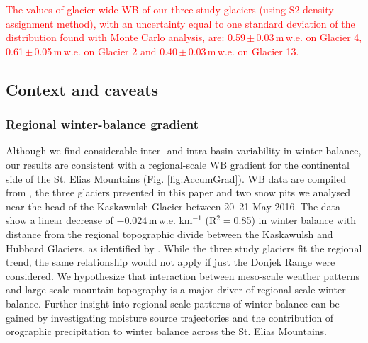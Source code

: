 \documentclass[review,oneside, letterpaper]{igs}
\begin{document}
\textcolor{red}{The values of glacier-wide WB of our three study glaciers (using S2 density assignment method), with an uncertainty equal to one standard deviation of the distribution found with Monte Carlo analysis, are: 0.59\,$\pm$\,0.03\,m\,w.e. on Glacier 4, 0.61\,$\pm$\,0.05\,m\,w.e. on Glacier 2 and 0.40\,$\pm$\,0.03\,m\,w.e. on Glacier 13.}

\subsection{Context and caveats}
\subsubsection{Regional winter-balance gradient}

Although we find considerable inter- and intra-basin variability in winter balance, our results are consistent with a regional-scale WB gradient for the continental side of the St. Elias Mountains (Fig. \ref{fig:AccumGrad}). WB data are compiled from \cite{Taylor1969}, the three glaciers presented in this paper and two snow pits we analysed near the head of the Kaskawulsh Glacier between 20--21 May 2016. The data show a linear decrease of $-0.024$\,m\,w.e. km$^{-1}$ (R$^2=$0.85) in winter balance with distance from the regional topographic divide between the Kaskawulsh and Hubbard Glaciers, as identified by \cite{Taylor1969}. While the three study glaciers fit the regional trend, the same relationship would not apply if just the Donjek Range were considered. We hypothesize that interaction between meso-scale weather patterns and large-scale mountain topography is a major driver of regional-scale winter balance. Further insight into regional-scale patterns of winter balance can be gained by investigating moisture source trajectories and the contribution of orographic precipitation to winter balance across the St. Elias Mountains. 
\end{document}
